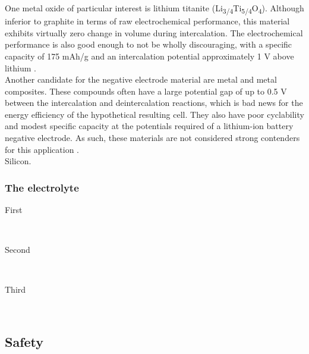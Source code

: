 \documentclass[12pt]{article} %
\begin{document}
One metal oxide of particular interest is lithium titanite (Li\textsubscript{3/4}Ti\textsubscript{5/4}O\textsubscript{4}).
Although inferior to graphite in terms of raw electrochemical performance, this material exhibits virtually zero change in volume during intercalation.
The electrochemical performance is also good enough to not be wholly discouraging, with a specific capacity of 175 mAh/g and an intercalation potential approximately 1 V above lithium \cite{kulova_new_2013} \cite{reddy_thomas_figure_2011}.
\\
Another candidate for the negative electrode material are metal and metal composites.
These compounds often have a large potential gap of up to 0.5 V between the intercalation and deintercalation reactions, which is bad news for the energy efficiency of the hypothetical resulting cell.
They also have poor cyclability and modest specific capacity at the potentials required of a lithium-ion battery negative electrode.
As such, these materials are not considered strong contenders for this application \cite{kulova_new_2013}.
\\
Silicon.


\subsubsection{The electrolyte} %

\begin{description} %

\item[First] \hfill \\
\lipsum[9] %

\item[Second] \hfill \\
\lipsum[10] %

\item[Third] \hfill \\
\lipsum[11] %

\end{description} 


\subsection{Safety}

\end{document}
